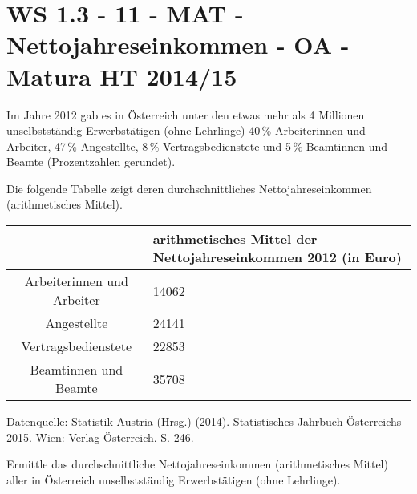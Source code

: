 \section{WS 1.3 - 11 - MAT - Nettojahreseinkommen - OA - Matura HT 2014/15}

\begin{beispiel}[WS 1.3]{1} %
Im Jahre 2012 gab es in Österreich unter den etwas mehr als 4 Millionen unselbstständig
Erwerbstätigen (ohne Lehrlinge) 40\,\% Arbeiterinnen und Arbeiter, 47\,\% Angestellte,
8\,\% Vertragsbedienstete und 5\,\% Beamtinnen und Beamte (Prozentzahlen gerundet). \leer

Die folgende Tabelle zeigt deren durchschnittliches Nettojahreseinkommen (arithmetisches Mittel).

\begin{center}
\begin{longtable}{|c|C{7cm}|} 
 & arithmetisches Mittel der Nettojahreseinkommen 2012 (in Euro)  \\ \hline
Arbeiterinnen und Arbeiter & 14062 \\ \hline
Angestellte & 24141 \\ \hline
Vertragsbedienstete & 22853 \\ \hline
Beamtinnen und Beamte & 35708 \\ \hline
\end{longtable}
\end{center} \vspace{-1.5cm}
\tiny Datenquelle: Statistik Austria (Hrsg.) (2014). Statistisches Jahrbuch Österreichs 2015. Wien: Verlag Österreich. S. 246.
\normalsize

Ermittle das durchschnittliche Nettojahreseinkommen (arithmetisches Mittel) aller in
Österreich unselbstständig Erwerbstätigen (ohne Lehrlinge).



\end{beispiel}
